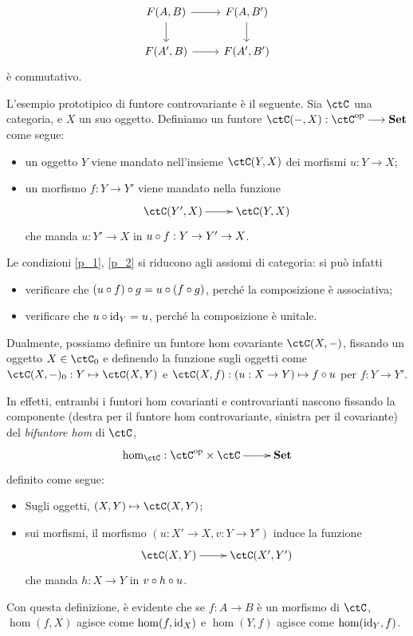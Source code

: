 \[
	\begin{tikzcd}
		F(A,B) \ar[r]\ar[d] & F(A,B') \ar[d]\\
		F(A',B) \ar[r] & F(A',B')
	\end{tikzcd}
\]
è commutativo.
\begin{example}\label{ex_hom_funtore}
	L'esempio prototipico di funtore controvariante è il seguente. Sia \(\ctC\) una categoria, e \(X\) un suo oggetto. Definiamo un funtore \(\ctC(-,X) : \ctC^\op\fun\ctSet\) come segue:
	\begin{itemize}
		\item un oggetto \(Y\) viene mandato nell'insieme \(\ctC(Y,X)\) dei morfismi \(u : Y\to X\);
		\item un morfismo \(f : Y\to Y'\) viene mandato nella funzione
		      \[\xymatrix{
				      \ctC(Y',X) \ar[r] & \ctC(Y,X)
			      }\]
		      che manda \(u : Y'\to X\) in \(u\circ f : Y\to Y' \to X\).
	\end{itemize}
	Le condizioni \ref{p_1}, \ref{p_2} si riducono agli assiomi di categoria: si può infatti
	\begin{itemize}
		\item verificare che \((u\circ f)\circ g = u\circ (f\circ g)\), perché la composizione è associativa;
		\item verificare che \(u\circ \mathrm{id}_Y = u\), perché la composizione è unitale.
	\end{itemize}
	Dualmente, possiamo definire un funtore hom covariante \(\ctC(X,-)\), fissando un oggetto \(X\in\ctC_0\) e definendo la funzione sugli oggetti come \(\ctC(X,-)_0 : Y\mapsto \ctC(X,Y)\) e \(\ctC(X,f) : (u : X\to Y)\mapsto f\cmp u\) per \(f : Y\to Y'\).

	 In effetti, entrambi i funtori hom covarianti e controvarianti nascono fissando la componente (destra per il funtore hom controvariante, sinistra per il covariante) del \emph{bifuntore hom} di \(\ctC\),
	\[\xymatrix{\hom_\ctC : \ctC^\op\times\ctC \ar[r] & \ctSet}\]
	definito come segue:
	\begin{itemize}
		\item Sugli oggetti, \((X,Y)\mapsto \ctC(X,Y)\);
		\item sui morfismi, il morfismo \((u : X'\to X, v : Y\to Y')\) induce la funzione
		      \[\xymatrix{\ctC(X,Y) \ar[r] & \ctC(X',Y')}\]
		      che manda \(h : X\to Y\) in \(v\circ h\circ u\).
	\end{itemize}
	Con questa definizione, è evidente che se \(f : A\to B\) è un morfismo di \(\ctC\), \(\hom(f,X)\) agisce come \(\hom(f,\mathrm{id}_X)\) e \(\hom(Y,f)\) agisce come \(\hom(\mathrm{id}_Y,f)\).
\end{example}

